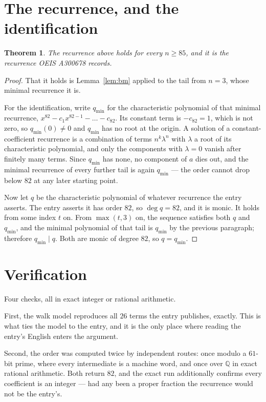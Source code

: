 \documentclass[11pt,a4paper]{article}
\theoremstyle{plain}
\newtheorem{theorem}{Theorem}
\theoremstyle{definition}
\begin{document}
\section{The recurrence, and the identification}

\begin{theorem}
The recurrence above holds for every $n\ge85$, and it is the recurrence OEIS A300678 records.
\end{theorem}

\begin{proof}
That it holds is Lemma~\ref{lem:bm} applied to the tail from $n=3$, whose minimal
recurrence it is.

For the identification, write $q_{\min}$ for the characteristic polynomial of that minimal
recurrence, $x^{82}-c_1x^{82-1}-\dots-c_{82}$. Its constant term is
$-c_{82}=1$, which is not zero, so $q_{\min}(0)\neq0$ and $q_{\min}$ has no
root at the origin. A solution of a constant-coefficient recurrence is a combination of terms
$n^{k}\lambda^{n}$ with $\lambda$ a root of its characteristic polynomial, and only the
components with $\lambda=0$ vanish after finitely many terms. Since $q_{\min}$ has none, no
component of $a$ dies out, and the minimal recurrence of every further tail is again
$q_{\min}$ --- the order cannot drop below $82$ at any later starting point.

Now let $q$ be the characteristic polynomial of whatever recurrence the entry asserts. The
entry asserts it has order $82$, so $\deg q=82$, and it is monic. It holds from some
index $t$ on. From $\max(t,3)$ on, the sequence satisfies both $q$ and $q_{\min}$, and
the minimal polynomial of that tail is $q_{\min}$ by the previous paragraph; therefore
$q_{\min}\mid q$. Both are monic of degree $82$, so $q=q_{\min}$.
\end{proof}

\section{Verification}

Four checks, all in exact integer or rational arithmetic.

First, the walk model reproduces all $26$ terms the entry publishes, exactly. This is
what ties the model to the entry, and it is the only place where reading the entry's English
enters the argument.

Second, the order was computed twice by independent routes: once modulo a $61$-bit prime, where
every intermediate is a machine word, and once over $\mathbb{Q}$ in exact rational arithmetic.
Both return $82$, and the exact run additionally confirms every coefficient is an integer
--- had any been a proper fraction the recurrence would not be the entry's.
\end{document}
